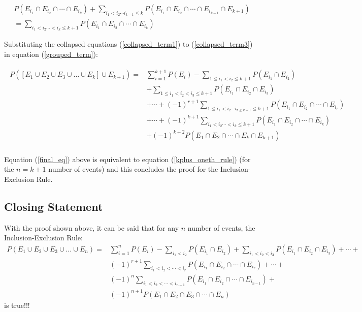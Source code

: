 \documentclass[a4paper]{article}
\begin{document}
    \begin{multline} \label{collapsed_term3}
        P(E_{i_1} \cap E_{i_2} \cap \cdots \cap E_{i_k}) + \sum_{i_1 < i_2 \cdots i_{k - 1} \le k} P(E_{i_1} \cap E_{i_2} \cap \cdots \cap E_{i_{k - 1}} \cap E_{k + 1}) \\
        = \sum_{i_1 < i_2 \cdots < i_k \le {k + 1}} P(E_{i_1} \cap E_{i_2} \cap \cdots \cap E_{i_k})
    \end{multline}

    Substituting the collapsed equations (\ref{collapsed_term1}) to (\ref{collapsed_term3}) in equation (\ref{grouped_term}):

    \begin{align}
        \begin{split} \label{final_eq}
            P([E_1 \cup E_2 \cup E_3 \cup \dots \cup E_k] \cup E_{k + 1}) = & \sum_{i = 1}^{k + 1} P(E_i) - \sum_{1 \le i_1 < i_2 \le {k + 1}} P(E_{i_1} \cap E_{i_2}) \\
            & + \sum_{1 \le i_1 < i_2 < i_3 \le {k + 1}} P(E_{i_1} \cap E_{i_2} \cap E_{i_3}) \\
            & + \cdots + {(-1)}^{r + 1} \sum_{1 \le i_1 < i_2 \cdots i_{r \le {k + 1}} \le {k + 1}} P(E_{i_1} \cap E_{i_2} \cap \cdots \cap E_{i_r}) \\
            & + \cdots + {(-1)}^{k + 1} \sum_{i_1 < i_2 \cdots < i_k \le {k + 1}} P(E_{i_1} \cap E_{i_2} \cap \cdots \cap E_{i_k}) \\
            & + {(-1)}^{k + 2} P(E_1 \cap E_2 \cap \cdots \cap E_k \cap E_{k + 1}) \\
        \end{split}
    \end{align}

    Equation (\ref{final_eq}) above is equivalent to equation (\ref{kplus_oneth_rule}) (for the $n = k + 1$ number of events) and this concludes the proof for the Inclusion-Exclusion Rule.

    \subsection*{Closing Statement}
    With the proof shown above, it can be said that for any $n$ number of events, the Inclusion-Exclusion Rule:
    \begin{equation*}
        \begin{split}
            P(E_1 \cup E_2 \cup E_3 \cup \dots \cup E_n) = & \sum_{i = 1}^{n} P(E_i) - \sum_{i_1 < i_2} P(E_{i_1} \cap E_{i_2}) + \sum_{i_1 < i_2 < i_3} P(E_{i_1} \cap E_{i_2} \cap E_{i_3}) + \cdots + \\
            & {(-1)}^{r + 1} \sum_{i_1 < i_2 < \cdots < i_r} P(E_{i_1} \cap E_{i_2} \cap \cdots \cap E_{i_r}) + \cdots + \\
            & {(-1)}^{n} \sum_{i_1 < i_2 < \cdots < i_{n-1}} P(E_{i_1} \cap E_{i_2} \cap \cdots \cap E_{i_{n-1}}) + \\
            & {(-1)}^{n + 1} P(E_1 \cap E_2 \cap E_3 \cap \cdots \cap E_n)
        \end{split}
    \end{equation*}
    is true!!!
\end{document}
